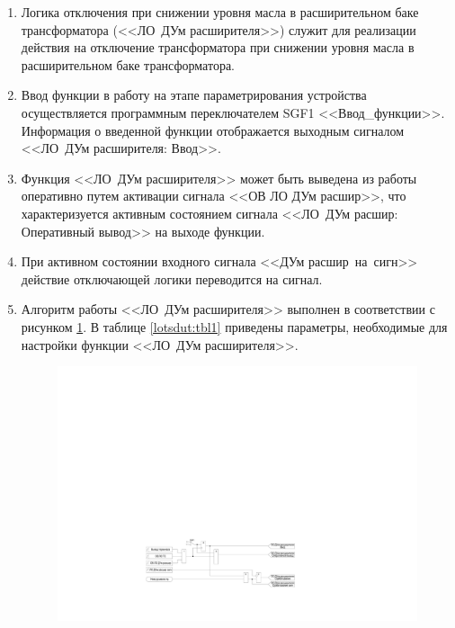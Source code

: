 \documentclass[a4paper, 12pt,table, hidelinks, DIV=calc]{extarticle} %
\begin{document}
\begin{enumerate}[label=\arabic{section}.\arabic{subsection}.\arabic{enumi}, labelsep=4pt, leftmargin=0pt, itemindent=57pt, itemsep=0pt, parsep=5pt]
\begin{enumerate}[label=\arabic{section}.\arabic{subsection}.\arabic{enumi}.\arabic*, labelsep=4pt, leftmargin=0em, itemindent=65pt, parsep=0pt]
\item
Логика отключения при снижении уровня масла в расширительном баке трансформатора (<<ЛО~ДУм расширителя>>) служит для реализации действия на отключение трансформатора при снижении уровня масла в расширительном баке трансформатора.
\item
Ввод функции в работу на этапе параметрирования устройства осуществляется программным переключателем SGF1 <<Ввод\_функции>>. Информация о введенной функции отображается выходным сигналом <<ЛО~ДУм расширителя: Ввод>>.
\item
Функция <<ЛО~ДУм расширителя>> может быть выведена из работы оперативно путем активации сигнала <<ОВ ЛО ДУм расшир>>, что характеризуется активным состоянием сигнала <<ЛО~ДУм расшир: Оперативный вывод>> на выходе функции. 
\item
При активном состоянии входного сигнала <<ДУм расшир~на~сигн>> действие отключающей логики переводится на сигнал. 
\item
Алгоритм работы <<ЛО~ДУм расширителя>> выполнен в соответствии с рисунком \ref{lotsdut:img1}. В таблице \ref{lotsdut:tbl1} приведены параметры, необходимые для настройки функции <<ЛО~ДУм расширителя>>.

\vspace{3mm}
\begin{figure}[H]
\centering
\includegraphics[width=1\textwidth,height=1\textheight,keepaspectratio]{img28.pdf}
\label{lotsdut:img1}
\end{figure}


\end{enumerate}
\end{enumerate}
\end{document}
